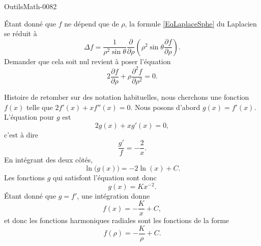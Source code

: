 
\begin{corrige}{OutilsMath-0082}

    Étant donné que $f$ ne dépend que de $\rho$, la formule \eqref{EqLaplaceSphe} du Laplacien se réduit à
    \begin{equation}
        \Delta f=\frac{1}{ \rho^2\sin\theta }\frac{ \partial  }{ \partial \rho }\left( \rho^2\sin\theta\frac{ \partial f }{ \partial \rho } \right).
    \end{equation}
    Demander que cela soit nul revient à poser l'équation
    \begin{equation}
        2\frac{ \partial f }{ \partial \rho }+\rho\frac{ \partial^2f }{ \partial \rho^2 }=0.
    \end{equation}
    
    Histoire de retomber sur des notation habituelles, nous cherchons une fonction $f(x)$ telle que $2f'(x)+xf''(x)=0$. Nous posons d'abord $g(x)=f'(x)$. L'équation pour $g$ est
    \begin{equation}
        2g(x)+xg'(x)=0,
    \end{equation}
    c'est à dire
    \begin{equation}
        \frac{ g' }{ f }=-\frac{ 2 }{ x }.
    \end{equation}
    En intégrant des deux côtés,
    \begin{equation}
        \ln\big( g(x) \big)=-2\ln(x)+C.
    \end{equation}
    Les fonctions $g$ qui satisfont l'équation sont donc
    \begin{equation}
        g(x)=Kx^{-2}.
    \end{equation}
    Étant donné que $g=f'$, une intégration donne
    \begin{equation}
        f(x)=-\frac{ K }{ x }+C,
    \end{equation}
    et donc les fonctions harmoniques radiales sont les fonctions de la forme
    \begin{equation}
        f(\rho)=-\frac{ K }{ \rho }+C.
    \end{equation}

\end{corrige}
